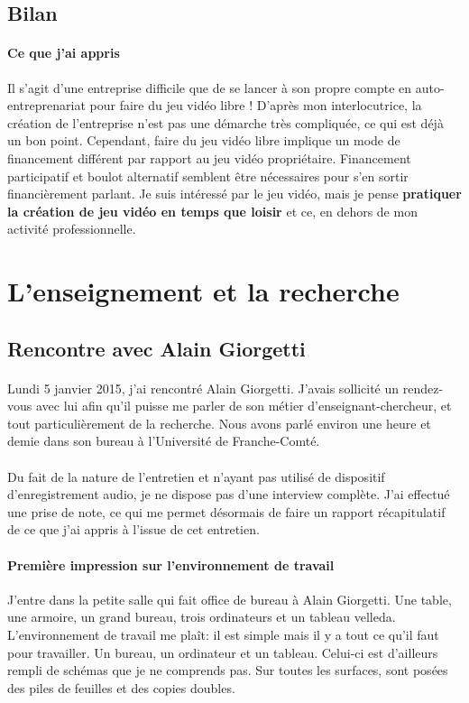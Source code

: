 \documentclass[a4paper,12pt, draft]{report}
\begin{document}
\subsection{Bilan}
\paragraph{Ce que j'ai appris}
Il s'agit d'une entreprise difficile que de se lancer à son propre compte en auto-entreprenariat pour faire du jeu vidéo libre ! D'après mon interlocutrice, la création de l'entreprise n'est pas une démarche très compliquée, ce qui est déjà un bon point. Cependant, faire du jeu vidéo libre implique un mode de financement différent par rapport au jeu vidéo propriétaire. Financement participatif et boulot alternatif semblent être nécessaires pour s'en sortir financièrement parlant.
Je suis intéressé par le jeu vidéo, mais je pense \textbf{pratiquer la création de jeu vidéo en temps que loisir} et ce, en dehors de mon activité professionnelle.

\section{L'enseignement et la recherche}
\subsection{Rencontre avec Alain Giorgetti}

\paragraph{}
Lundi 5 janvier 2015, j'ai rencontré Alain Giorgetti. J'avais sollicité un rendez-vous avec lui afin qu'il puisse me parler de son métier d'enseignant-chercheur, et tout particulièrement de la recherche. Nous avons parlé environ une heure et demie dans son bureau à l'Université de Franche-Comté.
\paragraph{}
Du fait de la nature de l'entretien et n'ayant pas utilisé de dispositif d'enregistrement audio, je ne dispose pas d'une interview complète. J'ai effectué une prise de note, ce qui me permet désormais de faire un rapport récapitulatif de ce que j'ai appris à l'issue de cet entretien.

\paragraph{Première impression sur l'environnement de travail}
J'entre dans la petite salle qui fait office de bureau à Alain Giorgetti. Une table, une armoire, un grand bureau, trois ordinateurs et un tableau velleda. L'environnement de travail me plaît: il est simple mais il y a tout ce qu'il faut pour travailler. Un bureau, un ordinateur et un tableau. Celui-ci est d'ailleurs rempli de schémas que je ne comprends pas. Sur toutes les surfaces, sont posées des piles de feuilles et des copies doubles.
\end{document}
